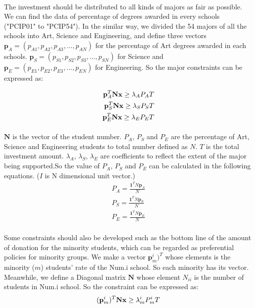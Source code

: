 \documentclass{mcmthesis}
\begin{document}
\paragraph{} The investment should be distributed to all kinds of majors as fair as possible. We can find the data of percentage of degrees awarded in every schools ("PCIP01" to "PCIP54"). In the similar way, we divided the 54 majors of all the schools into Art, Science and Engineering, and define three vectors $\mathbf{p}_A=(p_{A1}, p_{A2}, p_{A3}, ..., p_{AN})$ for the percentage of Art degrees awarded in each schools. $\mathbf{p}_S=(p_{S1}, p_{S2}, p_{S3}, ..., p_{SN})$ for Science and $\mathbf{p}_E=(p_{E1}, p_{E2}, p_{E3}, ..., p_{EN})$ for Engineering. So the  major constraints can be expressed as:

\begin{align}
\mathbf{p}_A^T\*\mathbf{N}\*\mathbf{x}\geq\lambda_A\*P_A\*T\\
\mathbf{p}_S^T\*\mathbf{N}\*\mathbf{x}\geq\lambda_S\*P_S\*T\\
\mathbf{p}_E^T\*\mathbf{N}\*\mathbf{x}\geq\lambda_E\*P_E\*T
\end{align}
\paragraph{} $\mathbf{N}$ is the vector of the student number. $P_A$, $P_S$ and $P_E$ are the percentage of Art, Science and Engineering students to total number defined as $N$. $T$ is the total investment amount. $\lambda_A$, $\lambda_S$, $\lambda_E$ are coefficients to reflect the extent of the major being supported.So the value of $P_A$, $P_S$ and $P_E$ can be calculated in the following equations. ($I$ is N dimensional unit vector.)
\begin{align}
P_A=\frac{\mathbf{1}^T N \mathbf{p}_A}{N}\\
P_S=\frac{\mathbf{1}^T N \mathbf{p}_S}{N}\\
P_E=\frac{\mathbf{1}^T N \mathbf{p}_E}{N}
\end{align}

\paragraph{} Some constraints should also be developed such as the bottom line of the amount of donation for the minority students, which can be regarded as preferential policies for minority groups. We make a vector $\mathbf{p}_{m}^i)^T$ whose elements is the minority ($m$) students' rate of the Num.i school. So each minority has its vector. Meanwhile, we define a Diagonal matrix $\mathbf{N}$ whose element $N_{ii}$ is the number of students in Num.i school. So the constraint can be expressed as:
\begin{align}
&(\mathbf{p}_{m}^i)^T\*\mathbf{N}\*\mathbf{x}\geq\lambda_{m}^i\*P_{m}^i\*T \\
\end{align}
\end{document}
